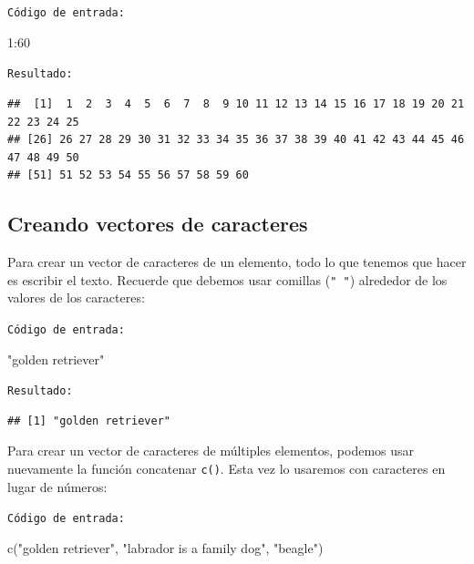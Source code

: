 \documentclass[
]{book}
\newenvironment{Shaded}{\begin{snugshade}}{\end{snugshade}}
\newcommand{\DecValTok}[1]{\textcolor[rgb]{0.00,0.00,0.81}{#1}}
\newcommand{\FunctionTok}[1]{\textcolor[rgb]{0.00,0.00,0.00}{#1}}
\newcommand{\NormalTok}[1]{#1}
\newcommand{\SpecialCharTok}[1]{\textcolor[rgb]{0.00,0.00,0.00}{#1}}
\newcommand{\StringTok}[1]{\textcolor[rgb]{0.31,0.60,0.02}{#1}}
\begin{document}
\texttt{Código\ de\ entrada:}

\begin{Shaded}
\begin{Highlighting}[]
\DecValTok{1}\SpecialCharTok{:}\DecValTok{60}
\end{Highlighting}
\end{Shaded}

\texttt{Resultado:}

\begin{verbatim}
##  [1]  1  2  3  4  5  6  7  8  9 10 11 12 13 14 15 16 17 18 19 20 21 22 23 24 25
## [26] 26 27 28 29 30 31 32 33 34 35 36 37 38 39 40 41 42 43 44 45 46 47 48 49 50
## [51] 51 52 53 54 55 56 57 58 59 60
\end{verbatim}

\hypertarget{creando-vectores-de-caracteres}{%
\subsection{Creando vectores de caracteres}\label{creando-vectores-de-caracteres}}

Para crear un vector de caracteres de un elemento, todo lo que tenemos que hacer es escribir el texto. Recuerde que debemos usar comillas (\texttt{"\ "}) alrededor de los valores de los caracteres:

\texttt{Código\ de\ entrada:}

\begin{Shaded}
\begin{Highlighting}[]
\StringTok{"golden retriever"}
\end{Highlighting}
\end{Shaded}

\texttt{Resultado:}

\begin{verbatim}
## [1] "golden retriever"
\end{verbatim}

Para crear un vector de caracteres de múltiples elementos, podemos usar nuevamente la función concatenar \texttt{c()}. Esta vez lo usaremos con caracteres en lugar de números:

\texttt{Código\ de\ entrada:}

\begin{Shaded}
\begin{Highlighting}[]
\FunctionTok{c}\NormalTok{(}\StringTok{"golden retriever"}\NormalTok{, }\StringTok{"labrador is a family dog"}\NormalTok{, }\StringTok{"beagle"}\NormalTok{)}
\end{Highlighting}
\end{Shaded}
\end{document}
